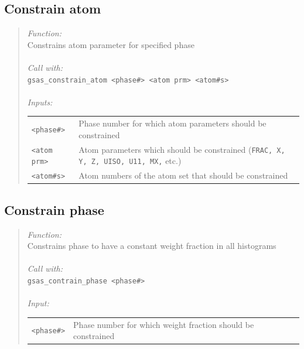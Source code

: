 \documentclass{article}
\begin{document}
\subsection{Constrain atom} 
\begin{quote}
\textit{Function:}\\
Constrains atom parameter for specified phase \\ \\
\textit{Call with:}\\
\texttt{gsas\_constrain\_atom <phase\#> <atom prm> <atom\#s>} \\  \\
\textit{Inputs:} \\
\begin{tabular}[t]{l l}
\texttt{<phase\#>} &  Phase number for which atom parameters should be constrained \\
\texttt{<atom prm>} &  Atom parameters which should be constrained (\texttt{FRAC, X, Y, Z, UISO, U11,
MX,} etc.) \\
\texttt{<atom\#s>} &  Atom numbers of the atom set that should be constrained \\
\end{tabular}
\end{quote}

\subsection{Constrain phase}
\begin{quote}
\textit{Function:}\\
Constrains phase to have a constant weight fraction in all histograms \\ \\
\textit{Call with:}\\
\texttt{gsas\_contrain\_phase <phase\#>} \\ \\ 
\textit{Input:}\\
\begin{tabular}[t]{l l}
\texttt{<phase\#>} &  Phase number for which weight fraction should be constrained
\\
\end{tabular}
\end{quote}

\end{document}
